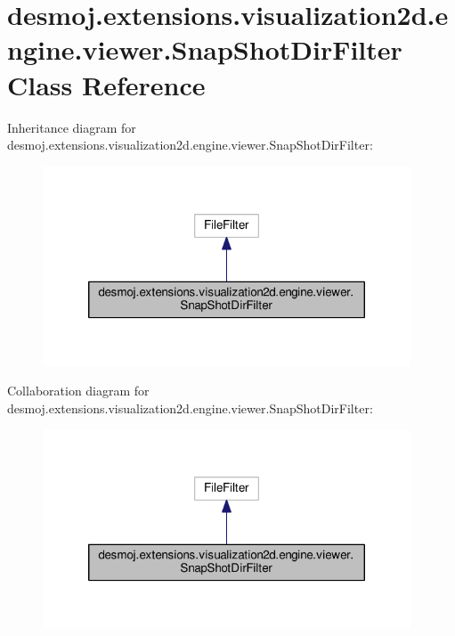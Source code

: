 \section{desmoj.\-extensions.\-visualization2d.\-engine.\-viewer.\-Snap\-Shot\-Dir\-Filter Class Reference}
\label{classdesmoj_1_1extensions_1_1visualization2d_1_1engine_1_1viewer_1_1_snap_shot_dir_filter}


Inheritance diagram for desmoj.\-extensions.\-visualization2d.\-engine.\-viewer.\-Snap\-Shot\-Dir\-Filter\-:
\nopagebreak
\begin{figure}[H]
\begin{center}
\leavevmode
\includegraphics[width=310pt]{classdesmoj_1_1extensions_1_1visualization2d_1_1engine_1_1viewer_1_1_snap_shot_dir_filter__inherit__graph}
\end{center}
\end{figure}


Collaboration diagram for desmoj.\-extensions.\-visualization2d.\-engine.\-viewer.\-Snap\-Shot\-Dir\-Filter\-:
\nopagebreak
\begin{figure}[H]
\begin{center}
\leavevmode
\includegraphics[width=310pt]{classdesmoj_1_1extensions_1_1visualization2d_1_1engine_1_1viewer_1_1_snap_shot_dir_filter__coll__graph}
\end{center}
\end{figure}
